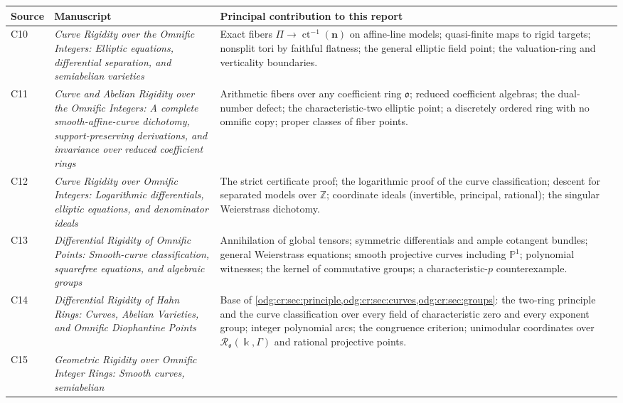 \documentclass[11pt,oneside]{article}
\numberwithin{equation}{section}
\theoremstyle{definition}
\theoremstyle{remark}
\newcommand{\Z}{\mathbb Z}
\newcommand{\ct}{\operatorname{ct}}
\begin{document}
\begin{center}
\renewcommand{\arraystretch}{1.2}
\begin{tabular}{>{\raggedright\arraybackslash}p{}>{\raggedright\arraybackslash}p{}>{\raggedright\arraybackslash}p{}}
\toprule
Source & Manuscript & Principal contribution to this report\\
\midrule
C10 & \emph{Curve Rigidity over the Omnific Integers: Elliptic equations,
differential separation, and semiabelian varieties} &
Exact fibers $\Pi\to\ct^{-1}(\mathbf n)$ on affine-line models; quasi-finite maps
to rigid targets; nonsplit tori by faithful flatness; the general elliptic field
point; the valuation-ring and verticality boundaries.\\
C11 & \emph{Curve and Abelian Rigidity over the Omnific Integers: A complete
smooth-affine-curve dichotomy, support-preserving derivations, and invariance over
reduced coefficient rings} &
Arithmetic fibers over any coefficient ring $\mathfrak o$; reduced coefficient
algebras; the dual-number defect; the characteristic-two elliptic point; a
discretely ordered ring with no omnific copy; proper classes of fiber points.\\
C12 & \emph{Curve Rigidity over Omnific Integers: Logarithmic differentials,
elliptic equations, and denominator ideals} &
The strict certificate proof; the logarithmic proof of the curve classification;
descent for separated models over $\Z$; coordinate ideals (invertible, principal,
rational); the singular Weierstrass dichotomy.\\
C13 & \emph{Differential Rigidity of Omnific Points: Smooth-curve classification,
squarefree equations, and algebraic groups} &
Annihilation of global tensors; symmetric differentials and ample cotangent bundles;
general Weierstrass equations; smooth projective curves including $\mathbb P^1$;
polynomial witnesses; the kernel of commutative groups; a characteristic-$p$
counterexample.\\
C14 & \emph{Differential Rigidity of Hahn Rings: Curves, Abelian Varieties, and
Omnific Diophantine Points} &
Base of \cref{odg:cr:sec:principle,odg:cr:sec:curves,odg:cr:sec:groups}: the
two-ring principle and the curve classification over every field of characteristic
zero and every exponent group; integer polynomial arcs; the congruence criterion;
unimodular coordinates over $\mathcal R_{\mathfrak o}(\Bbbk,\Gamma)$ and rational
projective points.\\
C15 & \emph{Geometric Rigidity over Omnific Integer Rings: Smooth curves, semiabelian
}
\end{tabular}
\end{center}
\end{document}
